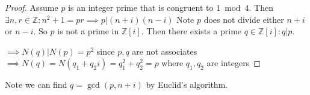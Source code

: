 \documentclass{article}
\theoremstyle{definition}\newtheorem{definition}{Definition}
\begin{document}
	
	\begin{proof}
		Assume $p$ is an integer prime that is congruent to $1\bmod 4$. Then $\exists n,r \in \mathbb Z : n^2+1=pr \implies p|(n+i)(n-i)$ Note $p$ does not divide either $n+i$ or $n-i$. So $p$ is not a prime in $\mathbb Z [i]$. Then there exists a prime $q \in \mathbb Z [i] : q|p$. 
		
		$\implies N(q)|N(p)=p^2$ since $p,q $ are not associates $\implies N(q)=N(q_1+q_2 i)=q_1^2+q_2^2=p$ where $q_1, q_2$ are integers
	\end{proof}
	
	Note we can find $q=\gcd(p,n+i)$ by Euclid's algorithm. 		
\end{document}
